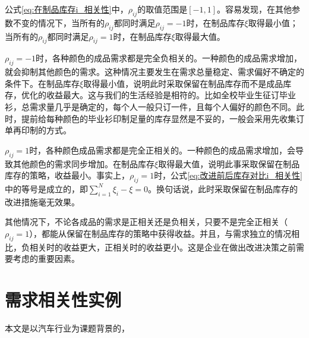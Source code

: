 公式\ref{eq:在制品库存i_相关性}中，$\rho_{ij}$的取值范围是$[-1,1]$。容易发现，在其他参数不变的情况下，当所有的$\rho_{ij}$都同时满足$\rho_{ij}=-1$时，在制品库存$\xi$取得最小值；当所有的$\rho_{ij}$都同时满足$\rho_{ij}=1$时，在制品库存$\xi$取得最大值。

$\rho_{ij}=-1$时，各种颜色的成品需求都是完全负相关的。一种颜色的成品需求增加，就会抑制其他颜色的需求。这种情况主要发生在需求总量稳定、需求偏好不确定的条件下。在制品库存$\xi$取得最小值，说明此时采取保留在制品库存而不是成品库存，优化的收益最大。这与我们的生活经验是相符的。比如全校毕业生征订毕业衫，总需求量几乎是确定的，每个人一般只订一件，且每个人偏好的颜色不同。此时，提前给每种颜色的毕业衫印制足量的库存显然是不妥的，一般会采用先收集订单再印制的方式。

$\rho_{ij}=1$时，各种颜色成品需求都是完全正相关的。一种颜色的成品需求增加，会导致其他颜色的需求同步增加。在制品库存$\xi$取得最大值，说明此事采取保留在制品库存的策略，收益最小。事实上，$\rho_{ij}=1$时，公式\ref{eq:改进前后库存对比i_相关性}中的等号是成立的，即$\sum_{i=1}^N\xi_i - \xi = 0$。换句话说，此时采取保留在制品库存的改进措施毫无效果。

其他情况下，不论各成品的需求是正相关还是负相关，只要不是完全正相关（$\rho_{ij}=1$），都能从保留在制品库存的策略中获得收益。并且，与需求独立的情况相比，负相关时的收益更大，正相关时的收益更小。这是企业在做出改进决策之前需要考虑的重要因素。









\section{需求相关性实例}

本文是以汽车行业为课题背景的，

















